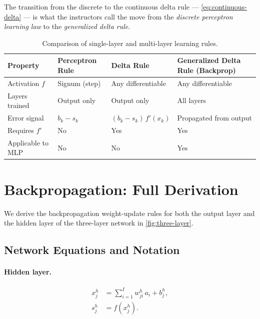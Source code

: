 \documentclass[12pt,a4paper]{article}
\newcommand{\wji}{w_{ji}^{h}}
\newcommand{\sho}{s_{j}^{h}}
\newcommand{\xho}{x_{j}^{h}}
\begin{document}
The transition from the discrete to the continuous delta rule --- \cref{eq:continuous-delta}
--- is what the instructors call the move from the \emph{discrete perceptron
learning law} to the \emph{generalized delta rule}.

\begin{table}[htbp]
\centering
\caption{Comparison of single-layer and multi-layer learning rules.}
\label{tab:learning-rule-comparison}
\begin{tabularx}{\linewidth}{lXXX}
\toprule
\textbf{Property} & \textbf{Perceptron Rule} & \textbf{Delta Rule} & \textbf{Generalized Delta Rule (Backprop)} \\
\midrule
Activation $f$ & Signum (step) & Any differentiable & Any differentiable \\
Layers trained & Output only & Output only & All layers \\
Error signal & $b_k - s_k$ & $(b_k - s_k)\,f'(x_k)$ & Propagated from output \\
Requires $f'$ & No & Yes & Yes \\
Applicable to MLP & No & No & Yes \\
\bottomrule
\end{tabularx}
\end{table}

\section{Backpropagation: Full Derivation}
\label{sec:backprop}

We derive the backpropagation weight-update rules for both the output layer and
the hidden layer of the three-layer network in \cref{fig:three-layer}.

\subsection{Network Equations and Notation}

\paragraph{Hidden layer.}
\begin{align}
  \xho &= \sum_{i=1}^{I} \wji\,a_i + b_j^{h},
  \label{eq:hidden-net}\\
  \sho &= f(\xho).
  \label{eq:hidden-out}
\end{align}
\end{document}
